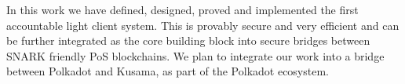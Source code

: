 In this work we have defined, designed, proved and implemented the first accountable light client system. 
This is provably secure and very efficient and can be further integrated as the core building block into secure bridges between SNARK friendly PoS blockchains. 
We plan to integrate our work into a bridge between Polkadot and Kusama, as part of the Polkadot ecosystem.
\vspace{-0.1in}
